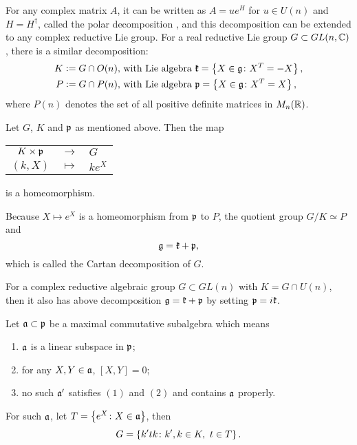 \documentclass[suri,pdfbookmark]{engsuribt} %
\begin{document}
  For any complex matrix $A$, it can be written as $A = u e^{H}$ for $u \in U(n)$ and $H = H^{\dagger}$, called the polar decomposition \cite{key27}, and this decomposition can be extended to any complex reductive Lie group. For a real reductive Lie group $G \subset GL(n,\mathbb{C})$, there is a similar decomposition:
  \begin{equation*}
    \begin{split}
      K \vcentcolon= G \cap O(n),~&\text{with Lie algebra } \mathfrak{k} = \left\{X \in \mathfrak{g} \colon X^T=-X\right\}, \\
      P \vcentcolon= G \cap P(n),~&\text{with Lie algebra } \mathfrak{p} = \left\{X \in \mathfrak{g} \colon X^T=X\right\},
    \end{split}
  \end{equation*}
  where $P(n)$ denotes the set of all positive definite matrices in $M_n(\mathbb{R})$.
  \begin{thm}
    Let $G$, $K$ and $\mathfrak{p}$ as mentioned above. Then the map
    \begin{center}
      \begin{tabular}{c c l}
        $K \times \mathfrak{p}$ & $\longrightarrow$ & $G$ \\
         $(k,X)$ & $\longmapsto$ & $ke^X$
      \end{tabular}
    \end{center}
    is a homeomorphism.
  \end{thm}
  Because $X \mapsto e^X$ is a homeomorphism from $\mathfrak{p}$ to $P$, the quotient group $G/K \simeq P$ and 
  \begin{equation*}
     \mathfrak{g} = \mathfrak{k} + \mathfrak{p},
  \end{equation*}
  which is called the Cartan decomposition of $G$.
  \begin{rem}
    For a complex reductive algebraic group $G \subset GL(n)$ with $K = G \cap U(n)$, then it also has above decomposition $\mathfrak{g} = \mathfrak{k} + \mathfrak{p}$ by setting $\mathfrak{p} = i\mathfrak{k}$.
  \end{rem}

  Let $\mathfrak{a} \subset \mathfrak{p}$ be a maximal commutative subalgebra which means 
  \begin{enumerate}[label = (\arabic*)]
    \item $\mathfrak{a}$ is a linear subspace in $\mathfrak{p}$;
    \item for any $X,Y\in \mathfrak{a}$, $[X,Y] = 0$;
    \item no such $\mathfrak{a}^{\prime}$ satisfies $(1)$ and $(2)$ and contains $\mathfrak{a}$ properly.
  \end{enumerate}
  For such $\mathfrak{a}$, let $T = \left\{e^{X} \colon X \in \mathfrak{a}\right\}$, then \cite{key5}
  \begin{equation*}\label{eq:3}
    G = \left\{k^{\prime}tk \colon k^{\prime},k \in K,~t \in T\right\}.
  \end{equation*}
\end{document}
